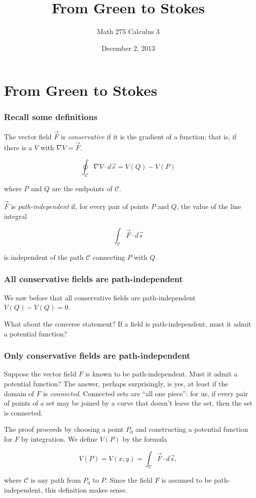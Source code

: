 \documentclass[11pt,ignorenonframetext,aspectratio=169,xcolor={svgnames}]{beamer}
\title{From Green to Stokes}
\author{Math 275 Calculus 3}
\date{December 2, 2013}
\begin{document}
\frame{\titlepage}

\section{From Green to Stokes}

\begin{frame}\frametitle{Recall some definitions}

The vector field $\vec{F}$ is \emph{conservative} if it is the gradient
of a function; that is, if there is a $V$ with $\nabla V = \vec{F}$.

\begin{equation*}
    \oint_{\mathcal{C}} \nabla V \cdot d\vec{s} = V(Q) - V(P)
\end{equation*}

where $P$ and $Q$ are the endpoints of $\mathcal{C}$.

$\vec{F}$ is \emph{path-independent} if, for every pair of points $P$
and $Q$, the value of the line integral

\begin{equation*}
    \int_{\mathcal{C}} \vec{F} \cdot d\vec{s}
\end{equation*}

is independent of the path $\mathcal{C}$ connecting $P$ with $Q$.

\end{frame}

\begin{frame}\frametitle{All conservative fields are path-independent}

We saw before that all conservative fields are path-independent
$V(Q) - V(Q) = 0$.

What about the converse statement? If a field is path-independent, must
it admit a potential function?

\end{frame}

\begin{frame}\frametitle{Only conservative fields are path-independent}

Suppose the vector field $F$ is known to be path-independent. Must it
admit a potential function? The answer, perhaps surprisingly, is yes, at
least if the domain of $F$ is \emph{connected}. Connected sets are ``all
one piece'': for us, if every pair of points of a set may be joined by a
curve that doesn't leave the set, then the set is connected.

The proof proceeds by choosing a point $P_0$ and constructing a
potential function for $F$ by integration. We define $V(P)$ by the
formula

\[ V(P) = V(x,y) = \int_{\mathcal{C}} \vec{F} \cdot d\vec{s}, \]

where $\mathcal{C}$ is any path from $P_0$ to $P$. Since the field $F$
is assumed to be path-independent, this definition makes sense.

\end{frame}
\end{document}
